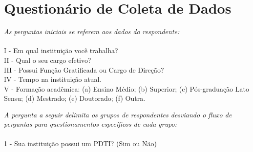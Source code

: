 \chapter{Questionário de Coleta de Dados} 
\label{apendice:a_quest_coleta}

\textit{As perguntas iniciais se referem aos dados do respondente:}
\\
\\I - Em qual instituição você trabalha?
\\II - Qual o seu cargo efetivo?
\\III - Possui Função Gratificada ou Cargo de Direção?
\\IV - Tempo na instituição atual.
\\V - Formação acadêmica: 
(a) Ensino Médio; (b) Superior; (c) Pós-graduação Lato Sensu; (d) Mestrado; (e) Doutorado; (f) Outra.

\textit{A pergunta a seguir delimita os grupos de respondentes desviando o fluxo de perguntas para questionamentos específicos de cada grupo:}
\\
\\1 - Sua instituição possui um PDTI? (Sim ou Não)

